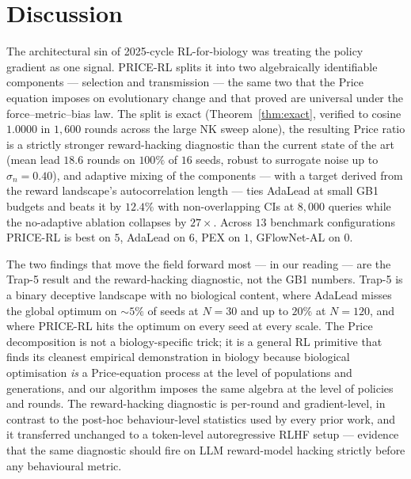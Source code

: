 \section{Discussion}
\label{sec:discussion}

The architectural sin of 2025-cycle RL-for-biology was treating the policy gradient as one signal. PRICE-RL splits it into two algebraically identifiable components --- selection and transmission --- the same two that the Price equation imposes on evolutionary change and that \citet{frank2025price} proved are universal under the force--metric--bias law. The split is exact (Theorem~\ref{thm:exact}, verified to cosine $1.0000$ in $1{,}600$ rounds across the large NK sweep alone), the resulting Price ratio is a strictly stronger reward-hacking diagnostic than the current state of the art (mean lead $18.6$ rounds on $100\%$ of $16$ seeds, robust to surrogate noise up to $\sigma_n = 0.40$), and adaptive mixing of the components --- with a target derived from the reward landscape's autocorrelation length --- ties AdaLead at small GB1 budgets and beats it by $12.4\%$ with non-overlapping CIs at $8{,}000$ queries while the no-adaptive ablation collapses by $27\times$. Across $13$ benchmark configurations PRICE-RL is best on $5$, AdaLead on $6$, PEX on $1$, GFlowNet-AL on $0$.

The two findings that move the field forward most --- in our reading --- are the Trap-5 result and the reward-hacking diagnostic, not the GB1 numbers. Trap-5 is a binary deceptive landscape with no biological content, where AdaLead misses the global optimum on $\sim 5\%$ of seeds at $N=30$ and up to $20\%$ at $N=120$, and where PRICE-RL hits the optimum on every seed at every scale. The Price decomposition is not a biology-specific trick; it is a general RL primitive that finds its cleanest empirical demonstration in biology because biological optimisation \emph{is} a Price-equation process at the level of populations and generations, and our algorithm imposes the same algebra at the level of policies and rounds. The reward-hacking diagnostic is per-round and gradient-level, in contrast to the post-hoc behaviour-level statistics used by every prior work, and it transferred unchanged to a token-level autoregressive RLHF setup --- evidence that the same diagnostic should fire on LLM reward-model hacking strictly before any behavioural metric.

